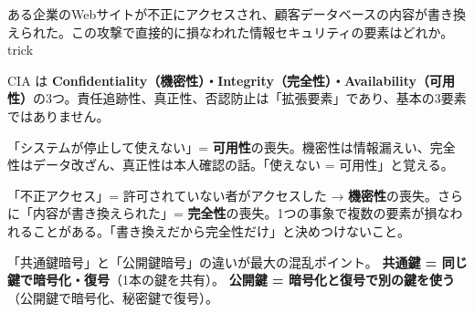 \begin{mondai}{ある企業のWebサイトが不正にアクセスされ、顧客データベースの内容が書き換えられた。この攻撃で直接的に損なわれた情報セキュリティの要素はどれか。}{trick}
\end{mondai}

\kaitoupage


\begin{kaisetsu}
CIA は \textbf{Confidentiality（機密性）・Integrity（完全性）・Availability（可用性）}の3つ。責任追跡性、真正性、否認防止は「拡張要素」であり、基本の3要素ではありません。
\end{kaisetsu}


\begin{kaisetsu}
「システムが停止して使えない」= \textbf{可用性}の喪失。機密性は情報漏えい、完全性はデータ改ざん、真正性は本人確認の話。「使えない = 可用性」と覚える。
\end{kaisetsu}


\begin{trickwarn}
「不正アクセス」= 許可されていない者がアクセスした → \textbf{機密性}の喪失。さらに「内容が書き換えられた」= \textbf{完全性}の喪失。1つの事象で複数の要素が損なわれることがある。「書き換えだから完全性だけ」と決めつけないこと。
\end{trickwarn}





\mondaipage
{}

\begin{stumble}
「共通鍵暗号」と「公開鍵暗号」の違いが最大の混乱ポイント。
\textbf{共通鍵 = 同じ鍵で暗号化・復号}（1本の鍵を共有）。
\textbf{公開鍵 = 暗号化と復号で別の鍵を使う}（公開鍵で暗号化、秘密鍵で復号）。
\end{stumble}


